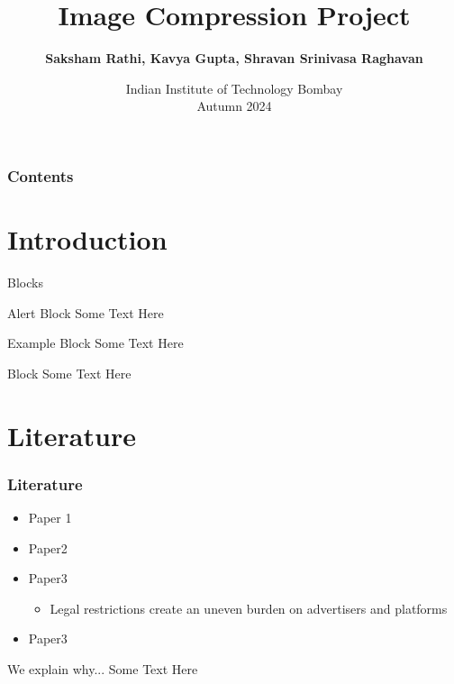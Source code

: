 \documentclass[Serif, 10pt, brown]{beamer}
\title[{Image Compression}]{\sc Image Compression Project}
\author[\ul{Authors}]{{\bf Saksham Rathi, Kavya Gupta, Shravan Srinivasa Raghavan}}
\institute[UTD]{\sc\small CS663: Digital Image Processing}
\date[UCI]{Indian Institute of Technology Bombay \\ Autumn 2024}
\theoremstyle{example}
\theoremstyle{plain}
\begin{document}
\frame{\titlepage}
%
%


\begin{frame}
	\transblindsvertical
	\frametitle{Contents}
	\tableofcontents[hidesubsections]
\end{frame}


\section[Introduction]{Introduction}

\begin{frame}{Blocks}
    \begin{alertblock}{Alert Block}
        Some Text Here 
    \end{alertblock}
    \begin{exampleblock} {Example Block}
        Some Text Here
    \end{exampleblock}
    \begin{block}{ Block}
        Some Text Here
    \end{block}
\end{frame}



\section[Literature]{Literature}
\begin{frame}
	\frametitle{Literature}
	\transfly
	\begin{itemize}
		\item Paper 1 ~\citep{Corbett18,Kochling20,Silva19}
		\item Paper2~\citep{Cowgill20}
		\pause
		\item Paper3~\citep{Lambrecht19}
		\begin{itemize}
			\item Legal restrictions create an uneven burden on advertisers and platforms~\citep{Yuan23}
		\end{itemize}
		\pause
		\item Paper3~\citep{Fu22}
	\end{itemize}
	\pause
	\begin{exampleblock}{We explain why...}
		Some Text Here 
	\end{exampleblock}
\end{frame}
\end{document}
